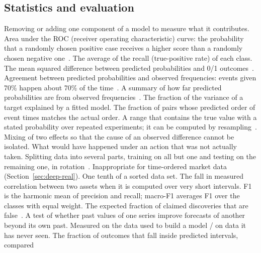 \subsection{Statistics and evaluation}
\begin{description}[leftmargin=1.2em,style=sameline,itemsep=1pt,font=\normalfont\bfseries]
 Removing or adding one component of a model to measure what it contributes.
 Area under the ROC (receiver operating characteristic) curve: the probability that a randomly chosen positive case receives a
  higher score than a randomly chosen negative one~\citep{fawcett2006}.
 The average of the recall (true-positive rate) of each class.
 The mean squared difference between predicted probabilities and 0/1
  outcomes~\citep{brier1950}.
 Agreement between predicted probabilities and observed frequencies: events given
  70\% happen about 70\% of the time~\citep{guo2017}.
 A summary of how far predicted probabilities are from observed frequencies~\citep{guo2017}.
 The fraction of the variance of a target explained by a fitted model.
 The fraction of pairs whose predicted order of event times matches the
  actual order.
 A range that contains the true value with a stated probability over
  repeated experiments; it can be computed by resampling~\citep{efron1993}.
 Mixing of two effects so that the cause of an observed difference cannot be
  isolated.
 What would have happened under an action that was not actually taken.
 Splitting data into several parts, training on all but one and testing on the
  remaining one, in rotation~\citep{hastie2009}. Inappropriate for time-ordered market data
  (Section~\ref{sec:deep-real}).
 One tenth of a sorted data set.
 The fall in measured correlation between two assets when it is computed over very short intervals.
 F1 is the harmonic mean of precision and recall; macro-F1 averages F1 over the
  classes with equal weight.
 The expected fraction of claimed discoveries that are
  false~\citep{benjamini1995}.
 A test of whether past values of one series improve forecasts of another beyond its own past.
 Measured on the data used to build a model / on data it has
  never seen.
 The fraction of outcomes that fall inside predicted intervals, compared

\end{description}
